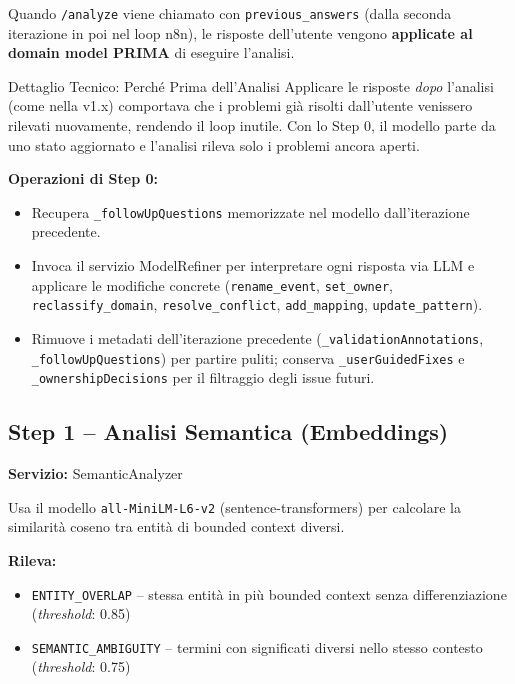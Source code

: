 \documentclass[12pt,a4paper]{report}
\begin{document}
Quando \texttt{/analyze} viene chiamato con \texttt{previous\_answers}
(dalla seconda iterazione in poi nel loop n8n), le risposte dell'utente
vengono \textbf{applicate al domain model PRIMA} di eseguire l'analisi.

\begin{technicalbox}{Dettaglio Tecnico: Perché Prima dell'Analisi}
Applicare le risposte \textit{dopo} l'analisi (come nella v1.x) comportava
che i problemi già risolti dall'utente venissero rilevati nuovamente,
rendendo il loop inutile. Con lo Step 0, il modello parte da uno stato
aggiornato e l'analisi rileva solo i problemi ancora aperti.

\textbf{Operazioni di Step 0:}
\begin{itemize}
  \item Recupera \texttt{\_followUpQuestions} memorizzate nel modello
        dall'iterazione precedente.
  \item Invoca il servizio ModelRefiner per
        interpretare ogni risposta via LLM e applicare le modifiche concrete
        (\texttt{rename\_event}, \texttt{set\_owner}, \texttt{reclassify\_domain},
        \texttt{resolve\_conflict}, \texttt{add\_mapping}, \texttt{update\_pattern}).
  \item Rimuove i metadati dell'iterazione precedente
        (\texttt{\_validationAnnotations}, \texttt{\_followUpQuestions})
        per partire puliti; conserva \texttt{\_userGuidedFixes} e
        \texttt{\_ownershipDecisions} per il filtraggio degli issue futuri.
\end{itemize}
\end{technicalbox}

\subsection{Step 1 -- Analisi Semantica (Embeddings)}

\textbf{Servizio:} SemanticAnalyzer

Usa il modello \texttt{all-MiniLM-L6-v2} (sentence-transformers) per calcolare
la similarità coseno tra entità di bounded context diversi.

\textbf{Rileva:}
\begin{itemize}
  \item \texttt{ENTITY\_OVERLAP} -- stessa entità in più bounded context
        senza differenziazione (\textit{threshold}: 0.85)
  \item \texttt{SEMANTIC\_AMBIGUITY} -- termini con significati diversi
        nello stesso contesto (\textit{threshold}: 0.75)
\end{itemize}
\end{document}

